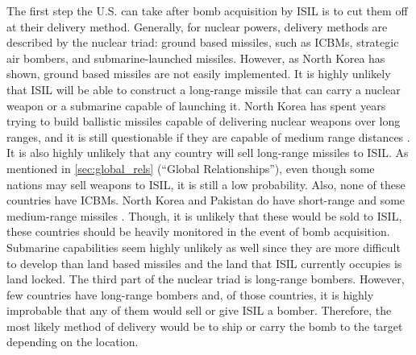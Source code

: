 \documentclass{report}
\begin{document}
The first step the U.S. can take after bomb acquisition by ISIL is to cut them off at their delivery method.  Generally, for nuclear powers, delivery methods are described by the nuclear triad: ground based missiles, such as ICBMs, strategic air bombers, and submarine-launched missiles.  However, as North Korea has shown, ground based missiles are not easily implemented.  It is highly unlikely that ISIL will be able to construct a long-range missile that can carry a nuclear weapon or a submarine capable of launching it.  North Korea has spent years trying to build ballistic missiles capable of delivering nuclear weapons over long ranges, and it is still questionable if they are capable of medium range distances \cite{Gladstone2015}.  It is also highly unlikely that any country will sell long-range missiles to ISIL.  As mentioned in \autoref{sec:global_rels} (\enquote{Global Relationships}), even though some nations may sell weapons to ISIL, it is still a low probability.  Also, none of these countries have ICBMs. North Korea and Pakistan do have short-range and some medium-range missiles \cite{Gladstone2015,NuclearThreatInitiative2014}.  Though, it is unlikely that these would be sold to ISIL, these countries should be heavily monitored in the event of bomb acquisition.  Submarine capabilities seem highly unlikely as well since they are more difficult to develop than land based missiles and the land that ISIL currently occupies is land locked.  The third part of the nuclear triad is long-range bombers.  However, few countries have long-range bombers and, of those countries, it is highly improbable that any of them would sell or give ISIL a bomber.  Therefore, the most likely method of delivery would be to ship or carry the bomb to the target depending on the location. 
\end{document}
